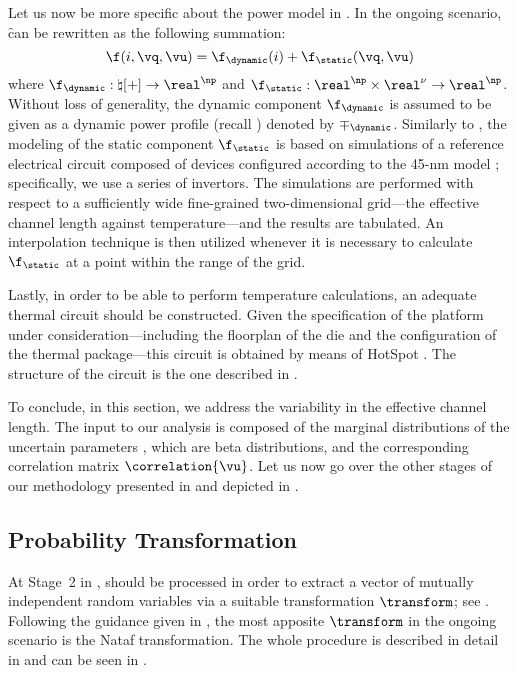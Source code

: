 Let us now be more specific about the power model in .
In the ongoing scenario, \f can be rewritten as the following summation:
\[
  \f(i, \vq, \vu) = \f_\dynamic(i) + \f_\static(\vq, \vu)
\]
where $\f_\dynamic: \natural[+] \to \real^\np$ and $\f_\static: \real^\np \times
\real^\nu \to \real^\np$. Without loss of generality, the dynamic component
$\f_\dynamic$ is assumed to be given as a dynamic power profile (recall
) denoted by $\mp_\dynamic$. Similarly to
, the modeling of the static component $\f_\static$ is based
on  simulations of a reference electrical circuit composed of
 devices \cite{bsim} configured according to the 45-nm 
 model \cite{ptm}; specifically, we use a series of  invertors.
The simulations are performed with respect to a sufficiently wide fine-grained
two-dimensional grid---the effective channel length against temperature---and
the results are tabulated. An interpolation technique is then utilized whenever
it is necessary to calculate $\f_\static$ at a point within the range of the
grid.

Lastly, in order to be able to perform temperature calculations, an adequate
thermal  circuit should be constructed. Given the specification of the
platform under consideration---including the floorplan of the die and the
configuration of the thermal package---this circuit is obtained by means of
HotSpot \cite{skadron2003}. The structure of the circuit is the one described in
.

To conclude, in this section, we address the variability in the effective
channel length. The input to our analysis is composed of the marginal
distributions of the uncertain parameters \vu, which are beta distributions, and
the corresponding correlation matrix $\correlation{\vu}$. Let us now go over the
other stages of our methodology presented in 
and depicted in .

\subsection{Probability Transformation}

At Stage~2 in , \vu should be processed in order to extract
a vector of mutually independent random variables \vz via a suitable
transformation $\transform$; see . Following the
guidance given in , the most apposite $\transform$ in
the ongoing scenario is the Nataf transformation. The whole procedure is
described in detail in  and can be seen in
.

